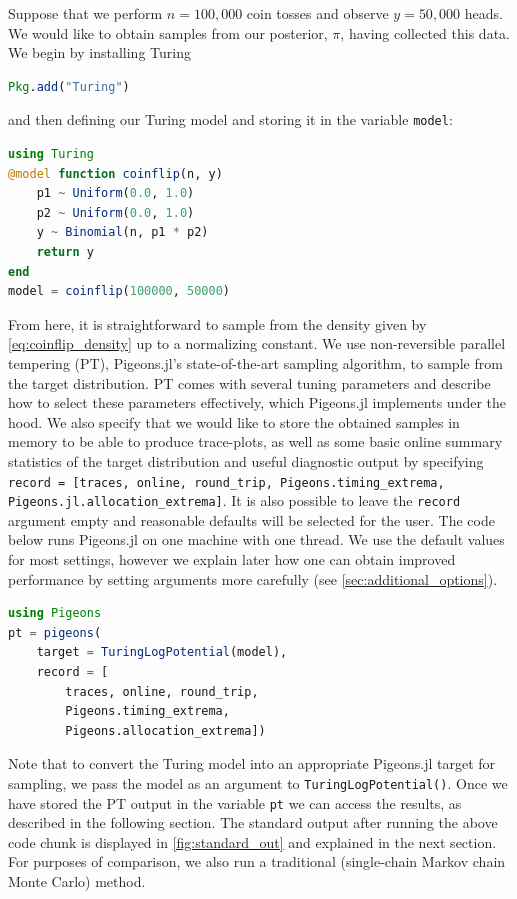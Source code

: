 \medskip 
Suppose that we perform $n=100,000$ coin tosses and observe 
$y=50,000$ heads.
We would like to obtain samples from our posterior, $\pi$, having collected this data.
We begin by installing Turing
\begin{lstlisting}[language = Julia]
Pkg.add("Turing")
\end{lstlisting}
and then defining our Turing model and storing it in the variable \texttt{model}:
\begin{lstlisting}[language = Julia]
using Turing
@model function coinflip(n, y)
    p1 ~ Uniform(0.0, 1.0)
    p2 ~ Uniform(0.0, 1.0)
    y ~ Binomial(n, p1 * p2)
    return y
end
model = coinflip(100000, 50000)
\end{lstlisting}

From here, it is straightforward to sample from the density given by 
\cref{eq:coinflip_density} up to a normalizing constant.
We use non-reversible parallel tempering \cite{syed2021nrpt} (PT), Pigeons.jl's 
state-of-the-art sampling algorithm, to sample from the target distribution.
PT comes with several tuning parameters and \cite{syed2021nrpt} describe how 
to select these parameters effectively, which Pigeons.jl implements under the hood.
We also specify that we would like to store 
the obtained samples in memory to be able to produce trace-plots, as well 
as some basic online summary statistics of the target distribution and useful 
diagnostic output by specifying 
\texttt{record = [traces, online, round\_trip, Pigeons.timing\_extrema, Pigeons.jl.allocation\_extrema]}.
It is also possible to leave the \texttt{record} argument empty and reasonable defaults 
will be selected for the user.
The code below runs Pigeons.jl on one machine with one thread.
We use the default values for most settings, however 
we explain later how one can obtain improved performance by setting 
arguments more carefully (see \cref{sec:additional_options}).
\begin{lstlisting}[language = Julia]
using Pigeons
pt = pigeons(
    target = TuringLogPotential(model), 
    record = [
        traces, online, round_trip, 
        Pigeons.timing_extrema, 
        Pigeons.allocation_extrema])
\end{lstlisting}
Note that to convert the Turing model into an appropriate Pigeons.jl target for sampling, 
we pass the model as an argument to \texttt{TuringLogPotential()}.
Once we have stored the PT output in the variable \texttt{pt} we can 
access the results, as described in the following section. 
The standard output after running the above code chunk is displayed in \cref{fig:standard_out}
and explained in the next section. 
For purposes of comparison, we also run a traditional 
(single-chain Markov chain Monte Carlo) method. 

